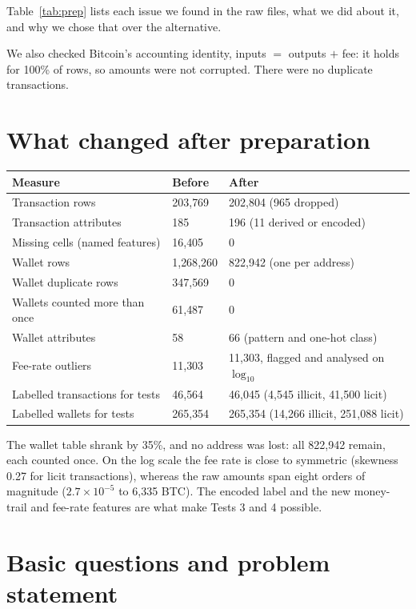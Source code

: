 \documentclass[10pt,a4paper,twocolumn]{article}
\begin{document}
Table~\ref{tab:prep} lists each issue we found in the raw files, what we did about it, and
why we chose that over the alternative.

We also checked Bitcoin's accounting identity, inputs $=$ outputs $+$ fee: it holds for 100\%
of rows, so amounts were not corrupted. There were no duplicate transactions.

\section{What changed after preparation}

{\footnotesize
\begin{tabularx}{\linewidth}{@{}L{3.0cm} L{1.7cm} Y@{}}
\toprule
\textbf{Measure} & \textbf{Before} & \textbf{After} \\
\midrule
Transaction rows & 203{,}769 & 202{,}804 (965 dropped) \\
Transaction attributes & 185 & 196 (11 derived or encoded) \\
Missing cells (named features) & 16{,}405 & 0 \\
Wallet rows & 1{,}268{,}260 & 822{,}942 (one per address) \\
Wallet duplicate rows & 347{,}569 & 0 \\
Wallets counted more than once & 61{,}487 & 0 \\
Wallet attributes & 58 & 66 (pattern and one-hot class) \\
Fee-rate outliers & 11{,}303 & 11{,}303, flagged and analysed on $\log_{10}$ \\
Labelled transactions for tests & 46{,}564 & 46{,}045 (4{,}545 illicit, 41{,}500 licit) \\
Labelled wallets for tests & 265{,}354 & 265{,}354 (14{,}266 illicit, 251{,}088 licit) \\
\bottomrule
\end{tabularx}}

The wallet table shrank by 35\%, and no address was lost: all 822{,}942 remain, each counted
once. On the log scale the fee rate is close to symmetric (skewness 0.27 for licit
transactions), whereas the raw amounts span eight orders of magnitude
($2.7\times10^{-5}$ to 6{,}335 BTC). The encoded label and
the new money-trail and fee-rate features are what make Tests 3 and 4 possible.

\section{Basic questions and problem statement}
\end{document}
